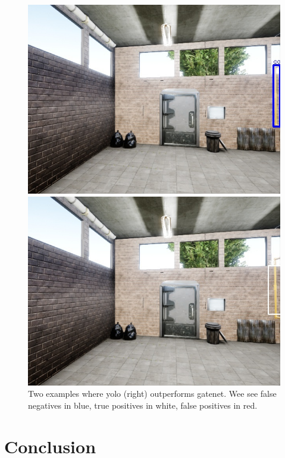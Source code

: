 \documentclass{article}
\begin{document}
\begin{figure}
	\begin{minipage}{0.45\linewidth}
		\includegraphics[width=\linewidth]{fig/example2_gate}
	\end{minipage}
	\begin{minipage}{0.45\linewidth}
		\includegraphics[width=\linewidth]{fig/example2_yolo}
	\end{minipage}
	\caption{Two examples where yolo (right) outperforms gatenet. Wee see false negatives in blue, true positives in white, false positives in red.}
\end{figure}


\section{Conclusion}
\end{document}
